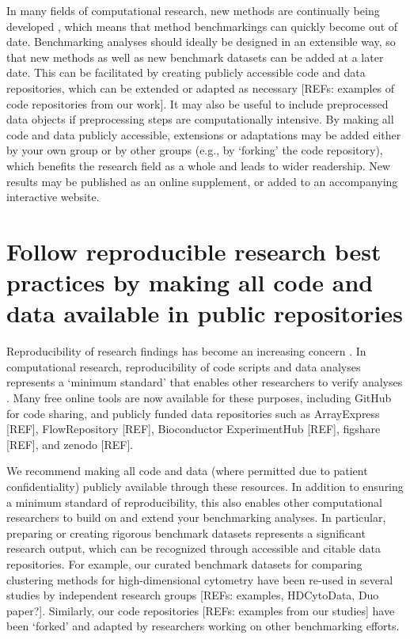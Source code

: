 \documentclass[12pt, a4paper]{article}
\begin{document}
In many fields of computational research, new methods are continually being developed \citep{Zappia2018}, which means that method benchmarkings can quickly become out of date. Benchmarking analyses should ideally be designed in an extensible way, so that new methods as well as new benchmark datasets can be added at a later date. This can be facilitated by creating publicly accessible code and data repositories, which can be extended or adapted as necessary [REFs: examples of code repositories from our work]. It may also be useful to include preprocessed data objects if preprocessing steps are computationally intensive. By making all code and data publicly accessible, extensions or adaptations may be added either by your own group or by other groups (e.g., by `forking' the code repository), which benefits the research field as a whole and leads to wider readership. New results may be published as an online supplement, or added to an accompanying interactive website.




\section{Follow reproducible research best practices by making all code and data available in public repositories}

Reproducibility of research findings has become an increasing concern \citep{Ioannidis2005}. In computational research, reproducibility of code scripts and data analyses represents a `minimum standard' that enables other researchers to verify analyses \citep{Peng2011}. Many free online tools are now available for these purposes, including GitHub for code sharing, and publicly funded data repositories such as ArrayExpress [REF], FlowRepository [REF], Bioconductor ExperimentHub [REF], figshare [REF], and zenodo [REF].

We recommend making all code and data (where permitted due to patient confidentiality) publicly available through these resources. In addition to ensuring a minimum standard of reproducibility, this also enables other computational researchers to build on and extend your benchmarking analyses. In particular, preparing or creating rigorous benchmark datasets represents a significant research output, which can be recognized through accessible and citable data repositories. For example, our curated benchmark datasets for comparing clustering methods for high-dimensional cytometry \citep{Weber2016} have been re-used in several studies by independent research groups [REFs: examples, HDCytoData, Duo paper?]. Similarly, our code repositories [REFs: examples from our studies] have been `forked' and adapted by researchers working on other benchmarking efforts.
\end{document}
